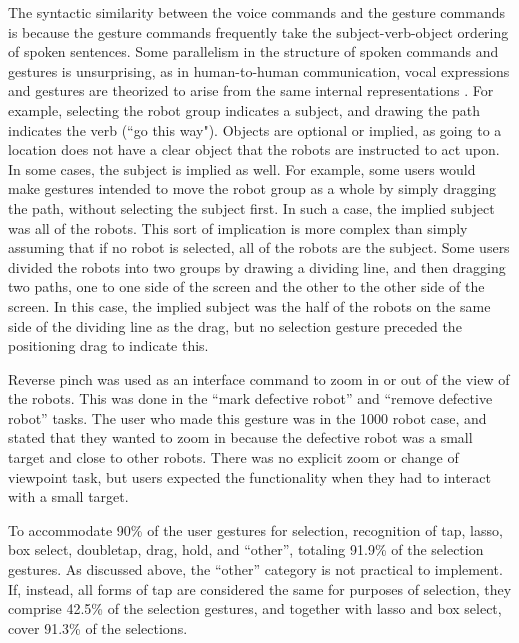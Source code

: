 The syntactic similarity between the voice commands and the gesture commands is because the gesture commands frequently take the subject-verb-object ordering of spoken sentences. 
Some parallelism in the structure of spoken commands and gestures is  unsurprising, as in human-to-human communication, vocal expressions and gestures are theorized to arise from the same internal representations \citep{mcneill1985so}. 
For example, selecting the robot group indicates a subject, and drawing the path indicates the verb (``go this way"). 
Objects are optional or implied, as going to a location does not have a clear object that the robots are instructed to act upon. 
In some cases, the subject is implied as well.
For example, some users would make gestures intended to move the robot group as a whole by simply dragging the path, without selecting the subject first. 
In such a case, the implied subject was all of the robots. 
This sort of implication is more complex than simply assuming that if no robot is selected, all of the robots are the subject. 
Some users divided the robots into two groups by drawing a dividing line, and then dragging two paths, one to one side of the screen and the other to the other side of the screen. 
In this case, the implied subject was the half of the robots on the same side of the dividing line as the drag, but no selection gesture preceded the positioning drag to indicate this. 


Reverse pinch was used as an interface command to zoom in or out of the view of the robots. This was done in the ``mark defective robot'' and ``remove defective robot'' tasks. 
The user who made this gesture was in the 1000 robot case, and stated that they wanted to zoom in because the defective robot was a small target and close to other robots. 
There was no explicit zoom or change of viewpoint task, but users expected the functionality when they had to interact with a small target.

To accommodate 90\% of the user gestures for selection, recognition of tap, lasso, box select, doubletap, drag, hold, and ``other'', totaling 91.9\% of the selection gestures.
As discussed above, the ``other'' category is not practical to implement. 
If, instead, all forms of tap are considered the same for purposes of selection, they comprise 42.5\% of the selection gestures, and together with lasso and box select, cover 91.3\% of the selections. 

